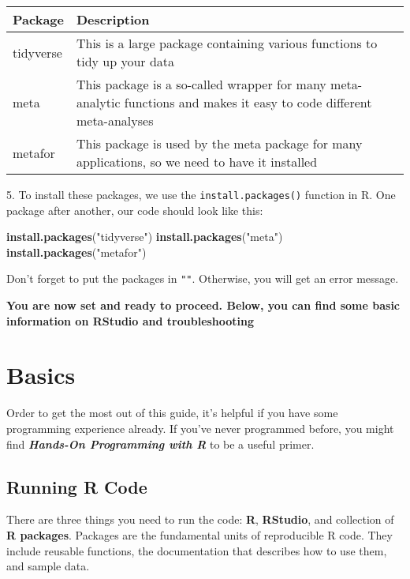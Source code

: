 \documentclass[]{book}
\newenvironment{Shaded}{\begin{snugshade}}{\end{snugshade}}
\newcommand{\KeywordTok}[1]{\textcolor[rgb]{0.13,0.29,0.53}{\textbf{#1}}}
\newcommand{\StringTok}[1]{\textcolor[rgb]{0.31,0.60,0.02}{#1}}
\newcommand{\NormalTok}[1]{#1}
\theoremstyle{definition}
\theoremstyle{definition}
\theoremstyle{definition}
\theoremstyle{remark}
\begin{document}
\begin{tabular}{l|l}
\hline
Package & Description\\
\hline
tidyverse & This is a large package containing various functions to tidy up your data\\
\hline
meta & This package is a so-called wrapper for many meta-analytic functions and makes it easy to code different meta-analyses\\
\hline
metafor & This package is used by the meta package for many applications, so we need to have it installed\\
\hline
\end{tabular}

 5. To install these packages, we use the \texttt{install.packages()}
function in R. One package after another, our code should look like
this:

\begin{Shaded}
\begin{Highlighting}[]
\KeywordTok{install.packages}\NormalTok{(}\StringTok{"tidyverse"}\NormalTok{)}
\KeywordTok{install.packages}\NormalTok{(}\StringTok{"meta"}\NormalTok{)}
\KeywordTok{install.packages}\NormalTok{(}\StringTok{"metafor"}\NormalTok{)}
\end{Highlighting}
\end{Shaded}

\begin{rmdachtung}
Don't forget to put the packages in \texttt{""}. Otherwise, you will get
an error message.
\end{rmdachtung}

\textbf{You are now set and ready to proceed. Below, you can find some
basic information on RStudio and troubleshooting}

\section{Basics}\label{basics}

Order to get the most out of this guide, it's helpful if you have some
programming experience already. If you've never programmed before, you
might find \textbf{\emph{Hands-On Programming with R}}
\citep{grolemund2014hands} to be a useful primer.

\subsection{Running R Code}\label{running-r-code}

There are three things you need to run the code: \textbf{R},
\textbf{RStudio}, and collection of \textbf{R packages}. Packages are
the fundamental units of reproducible R code. They include reusable
functions, the documentation that describes how to use them, and sample
data.
\end{document}
